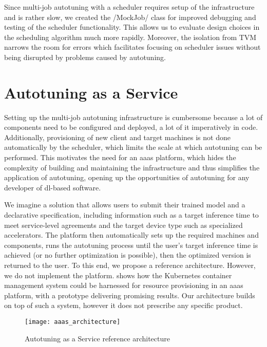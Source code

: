 Since multi-job autotuning with a scheduler requires setup of the infrastructure and is rather slow, we created the \pythoninline/MockJob/ class for improved debugging and testing of the scheduler functionality. This allows us to evaluate design choices in the scheduling algorithm much more rapidly. Moreover, the isolation from TVM narrows the room for errors which facilitates focusing on scheduler issues without being disrupted by problems caused by autotuning.

\section{Autotuning as a Service}
Setting up the multi-job autotuning infrastructure is cumbersome because a lot of components need to be configured and deployed, a lot of it imperatively in code. Additionally, provisioning of new client and target machines is not done automatically by the scheduler, which limits the scale at which autotuning can be performed. This motivates the need for an \gls{aaas} platform, which hides the complexity of building and maintaining the infrastructure and thus simplifies the application of autotuning, opening up the opportunities of autotuning for any developer of \gls{dl}-based software.

We imagine a solution that allows users to submit their trained model and a declarative specification, including information such as a target inference time to meet service-level agreements and the target device type such as specialized accelerators. The platform then automatically sets up the required machines and components, runs the autotuning process until the user's target inference time is achieved (or no further optimization is possible), then the optimized version is returned to the user. To this end, we propose a reference architecture. However, we do not implement the platform. \cite{Cho.2019} shows how the Kubernetes container management system could be harnessed for resource provisioning in an \gls{aaas} platform, with a prototype delivering promising results. Our architecture builds on top of such a system, however it does not prescribe any specific product.

\begin{figure}[h]
	\centering
	\texttt{[image: aaas\_architecture]}%
	\caption{Autotuning as a Service reference architecture}
	\label{fig:aaas-architecture}
\end{figure}

